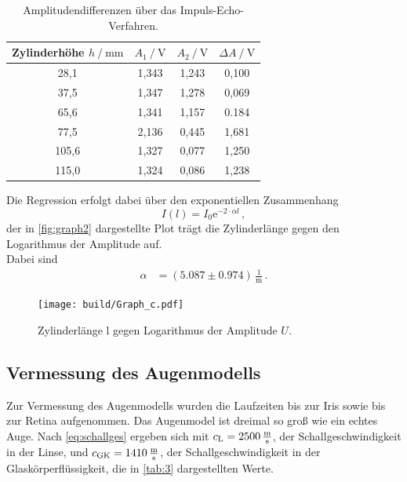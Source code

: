 \begin{table}
    \centering
    \caption{Amplitudendifferenzen über das Impuls-Echo-Verfahren.}
    \label{tab:2} 
    \begin{tabular}{c c c c}
    \toprule 
    {Zylinderhöhe $h \mathbin{/} \unit{\milli\meter}$} & {$A_1 \mathbin{/} \unit{\volt}$} & {$A_2 \mathbin{/} \unit{\volt}$} & {$\Delta A \mathbin{/} \unit{\volt}$}\\
    \midrule 
     28,1       &       1,343       &        1,243      &       0,100       \\       
     37,5       &       1,347       &        1,278      &       0,069       \\       
     65,6       &       1,341       &        1,157      &       0.184       \\       
     77,5       &       2,136       &        0,445      &       1,681       \\       
    105,6       &       1,327       &        0,077      &       1,250       \\
    115,0       &       1,324       &        0,086      &       1,238       \\               
    \bottomrule
    \end{tabular}  
\end{table}

Die Regression erfolgt dabei über den exponentiellen Zusammenhang
\begin{equation*}
    I(l) = I_0 \text{e}^{-2 \cdot \alpha l} \,,
\end{equation*}
der in \autoref{fig:graph2} dargestellte Plot trägt die Zylinderlänge gegen den Logarithmus der Amplitude auf. \\
Dabei sind
\begin{align*}
    \alpha  &= (5.087 \pm 0.974) \,\frac{1}{\unit{\meter}} \,.
\end{align*}

\begin{figure}[H]
    \centering
    \texttt{[image: build/Graph\_c.pdf]}
    \caption{Zylinderlänge l gegen Logarithmus der Amplitude $U$.}
    \label{fig:graph2}
\end{figure}

\newpage

\subsection{Vermessung des Augenmodells}


Zur Vermessung des Augenmodells wurden die Laufzeiten bis zur Iris sowie bis zur Retina aufgenommen. Das Augenmodel ist dreimal so groß wie ein echtes Auge. 
Nach \eqref{eq:schallges} ergeben sich mit $c_\text{L} = 2500 \,\unit{\frac{\meter}{\second}}$, der Schallgeschwindigkeit in der Linse, und
$c_\text{GK} = 1410 \,\unit{\frac{\meter}{\second}}$, der Schallgeschwindigkeit in der Glaskörperflüssigkeit, die in \autoref{tab:3} dargestellten Werte.


